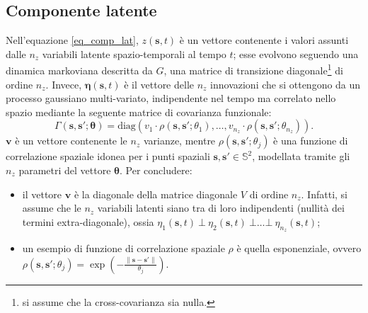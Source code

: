 \subsection[Componente latente]{Componente latente}
Nell'equazione \ref{eq_comp_lat}, $z(\mathbf{s}, t)$ è un vettore contenente i valori assunti dalle $n_z$ variabili latente spazio-temporali al tempo $t$; esse evolvono seguendo una dinamica markoviana descritta da $G$, una matrice di transizione diagonale\footnote{si assume che la cross-covarianza sia nulla.} di ordine $n_z$. Invece, $\boldsymbol{\eta}(\mathbf{s}, t)$ è il vettore delle $n_z$ innovazioni che si ottengono da un processo gaussiano multi-variato, indipendente nel tempo ma correlato nello spazio mediante la seguente matrice di covarianza funzionale:
\[
	\Gamma(\mathbf{s}, \mathbf{s}';\boldsymbol{\theta})=\text{diag}(v_1\cdot\rho(\mathbf{s}, \mathbf{s}';\theta_1),\dots,v_{n_z}\cdot\rho(\mathbf{s}, \mathbf{s}';\theta_{n_z})).
\]
$\mathbf{v}$ è un vettore contenente le $n_z$ varianze, mentre $\rho(\mathbf{s}, \mathbf{s}'; \theta_j)$ è una funzione di correlazione spaziale idonea per i punti spaziali $\mathbf{s}, \mathbf{s}'\in\mathbb{S}^2$, modellata tramite gli $n_z$ parametri del vettore $\boldsymbol{\theta}$. Per concludere:
\begin{itemize}
	\item il vettore $\mathbf{v}$ è la diagonale della matrice diagonale $V$ di ordine $n_z$. Infatti, si assume che le $n_z$ variabili latenti siano tra di loro indipendenti (nullità dei termini extra-diagonale), ossia $\eta_1(\mathbf{s}, t)\ \bot\ \eta_2(\mathbf{s}, t)\ \bot\dots\bot \ \eta_{n_z}(\mathbf{s}, t)$;
	\item un esempio di funzione di correlazione spaziale $\rho$ è quella esponenziale, ovvero $\rho(\mathbf{s}, \mathbf{s}'; \theta_j) = \exp(-\frac{\|\mathbf{s} - \mathbf{s}'\|}{\theta_j})$.
\end{itemize}

